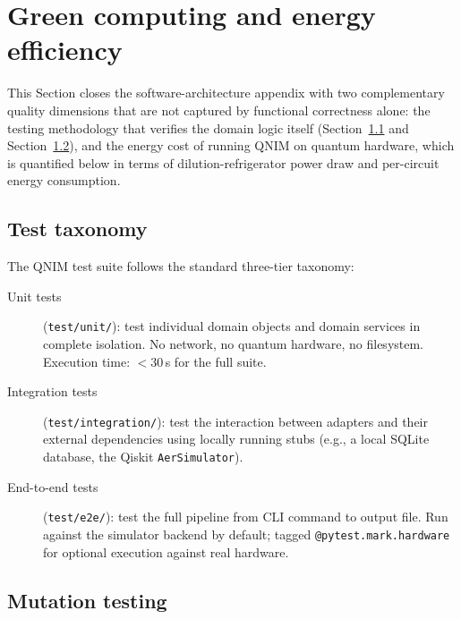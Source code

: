 \documentclass[11pt,a4paper, english]{book}
\theoremstyle{plain}
\theoremstyle{definition}
\numberwithin{equation}{chapter}
\numberwithin{figure}{chapter}
\numberwithin{table}{chapter}
\begin{document}
\section{Green computing and energy efficiency}
\label{app:sec:green_computing}

This Section closes the software-architecture appendix with two
complementary quality dimensions that are not captured by functional
correctness alone: the testing methodology that verifies the domain
logic itself (Section~\ref{subsec:test_taxonomy} and
Section~\ref{subsec:mutation_testing}), and the energy cost of running
QNIM on quantum hardware, which is quantified below in terms of
dilution-refrigerator power draw and per-circuit energy consumption.

\subsection{Test taxonomy}
\label{subsec:test_taxonomy}

The QNIM test suite follows the standard three-tier taxonomy:

\begin{description}
  \item[Unit tests] (\texttt{test/unit/}): test individual domain objects
    and domain services in complete isolation. No network, no quantum
    hardware, no filesystem. Execution time: $< 30$\,s for the full suite.

  \item[Integration tests] (\texttt{test/integration/}): test the interaction
    between adapters and their external dependencies using locally
    running stubs (e.g., a local SQLite database, the Qiskit
    \texttt{AerSimulator}).

  \item[End-to-end tests] (\texttt{test/e2e/}): test the full pipeline from
    CLI command to output file. Run against the simulator backend by
    default; tagged \texttt{@pytest.mark.hardware} for optional execution
    against real hardware.
\end{description}

\subsection{Mutation testing}
\label{subsec:mutation_testing}
\end{document}
